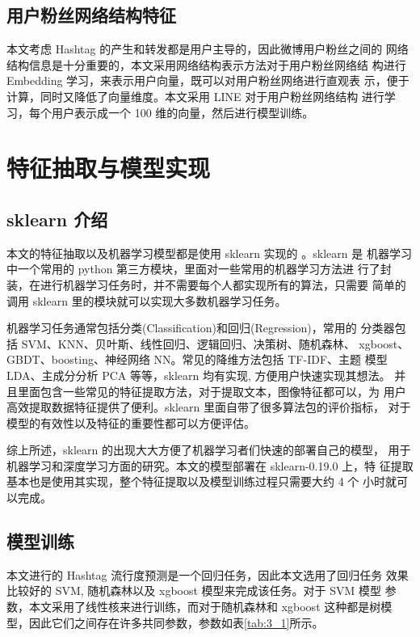 \subsection{用户粉丝网络结构特征}
本文考虑 Hashtag 的产生和转发都是用户主导的，因此微博用户粉丝之间的 网络结构信息是十分重要的，本文采用网络结构表示方法对于用户粉丝网络结 构进行 Embedding 学习，来表示用户向量，既可以对用户粉丝网络进行直观表 示，便于计算，同时又降低了向量维度。本文采用 LINE 对于用户粉丝网络结构 进行学习，每个用户表示成一个 100 维的向量，然后进行模型训练。

\section{特征抽取与模型实现}

\subsection{sklearn 介绍}

本文的特征抽取以及机器学习模型都是使用 sklearn 实现的 \citep{Komer2014Hyperopt}。sklearn 是 机器学习中一个常用的 python 第三方模块，里面对一些常用的机器学习方法进 行了封装，在进行机器学习任务时，并不需要每个人都实现所有的算法，只需要 简单的调用 sklearn 里的模块就可以实现大多数机器学习任务。

机器学习任务通常包括分类(Classification)和回归(Regression)，常用的 分类器包括 SVM、KNN、贝叶斯、线性回归、逻辑回归、决策树、随机森林、 xgboost、GBDT、boosting、神经网络 NN。常见的降维方法包括 TF-IDF、主题
 模型 LDA、主成分分析 PCA 等等，sklearn 均有实现, 方便用户快速实现其想法。 并且里面包含一些常见的特征提取方法，对于提取文本，图像特征都可以，为 用户高效提取数据特征提供了便利。sklearn 里面自带了很多算法包的评价指标， 对于模型的有效性以及特征的重要性都可以方便评估。
 
综上所述，sklearn 的出现大大方便了机器学习者们快速的部署自己的模型， 用于机器学习和深度学习方面的研究。本文的模型部署在 sklearn-0.19.0 上，特 征提取基本也是使用其实现，整个特征提取以及模型训练过程只需要大约 4 个 小时就可以完成。


\subsection{模型训练}

本文进行的 Hashtag 流行度预测是一个回归任务，因此本文选用了回归任务 效果比较好的 SVM, 随机森林以及 xgboost 模型来完成该任务。对于 SVM 模型 参数，本文采用了线性核来进行训练，而对于随机森林和 xgboost 这种都是树模 型，因此它们之间存在许多共同参数，参数如表\ref{tab:3_1}所示。

